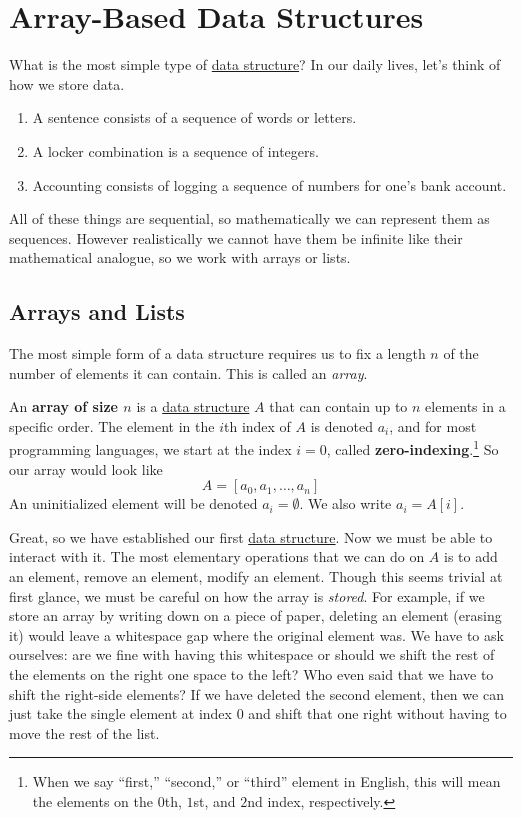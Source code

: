 \section{Array-Based Data Structures} 

  What is the most simple type of \hyperref[def:data-structure]{data structure}? In our daily lives, let's think of how we store data. 
  \begin{enumerate}
    \item A sentence consists of a sequence of words or letters. 
    \item A locker combination is a sequence of integers. 
    \item Accounting consists of logging a sequence of numbers for one's bank account. 
  \end{enumerate} 

  All of these things are sequential, so mathematically we can represent them as sequences. However realistically we cannot have them be infinite like their mathematical analogue, so we work with arrays or lists.  

\subsection{Arrays and Lists} 

  The most simple form of a data structure requires us to fix a length $n$ of the number of elements it can contain. This is called an \textit{array}. 

  \begin{definition}[Array]
    \label{def:array}
    An \textbf{array of size $n$} is a \hyperref[def:data-structure]{data structure} $A$ that can contain up to $n$ elements in a specific order. The element in the $i$th index of $A$ is denoted $a_i$, and for most programming languages, we start at the index $i=0$, called \textbf{zero-indexing}.\footnote{When we say ``first,'' ``second,'' or ``third'' element in English, this will mean the elements on the $0$th, $1$st, and $2$nd index, respectively.} So our array would look like
    \begin{equation}
      A = [a_0, a_1, \ldots, a_n]
    \end{equation} 
    An uninitialized element will be denoted $a_i = \emptyset$. We also write $a_i = A[i]$. 
  \end{definition} 

  Great, so we have established our first \hyperref[def:data-structure]{data structure}. Now we must be able to interact with it. The most elementary operations that we can do on $A$ is to add an element, remove an element, modify an element. Though this seems trivial at first glance, we must be careful on how the array is \textit{stored}. For example, if we store an array by writing down on a piece of paper, deleting an element (erasing it) would leave a whitespace gap where the original element was. We have to ask ourselves: are we fine with having this whitespace or should we shift the rest of the elements on the right one space to the left? Who even said that we have to shift the right-side elements? If we have deleted the second element, then we can just take the single element at index $0$ and shift that one right without having to move the rest of the list. 

